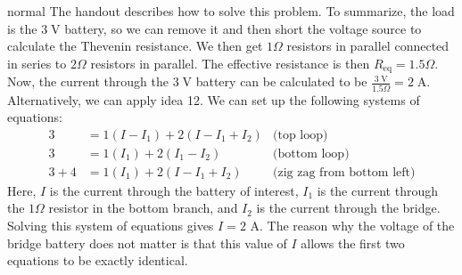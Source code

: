 \begin{solution}{normal}
The handout describes how to solve this problem. To summarize, the load is the $3\;\mathrm{V}$ battery, so we can remove it and then short the voltage source to calculate the Thevenin resistance. We then get $1 \Omega$ resistors in parallel connected in series to $2 \Omega$ resistors in parallel. The effective resistance is then $R_{\text{eq}} = 1.5 \Omega$. Now, the current through the $3\;\mathrm{V}$ battery can be calculated to be $\frac{3\;\mathrm{V}}{1.5 \Omega} = \boxed{2\;\mathrm{A}}.$
\tcbline
Alternatively, we can apply idea 12. We can set up the following systems of equations:
\begin{align*}
3 &= 1\left(I-I_1\right) + 2\left(I-I_1+I_2\right) & \text{(top loop)} \\ 
3 &= 1\left(I_1\right) + 2\left(I_1-I_2\right) & \text{(bottom loop)} \\ 
3 + 4 &= 1\left(I_1\right) +  2\left(I-I_1+I_2\right) & \text{(zig zag from bottom left)}
\end{align*}
Here, $I$ is the current through the battery of interest, $I_1$ is the current through the $1\Omega$ resistor in the bottom branch, and $I_2$ is the current through the bridge. Solving this system of equations gives $I=2\text{ A}$. The reason why the voltage of the bridge battery does not matter is that this value of $I$ allows the first two equations to be exactly identical.
\end{solution}